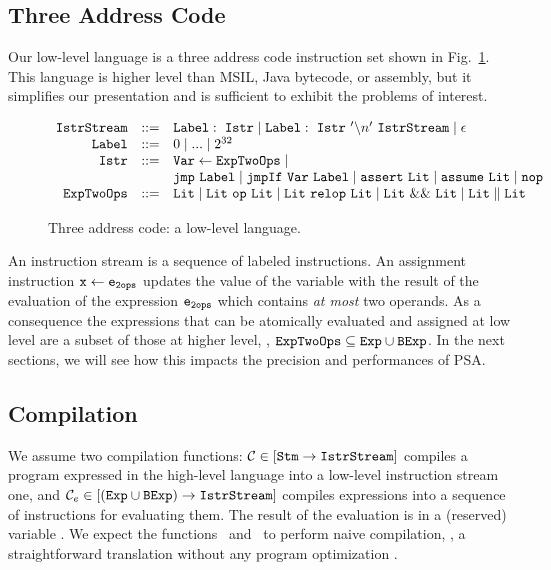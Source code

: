 \documentclass{llncs}
\begin{document}
\subsection{Three Address Code}
Our low-level language is a three address code instruction set shown
in Fig.~\ref{fig:ThreeAddressesInstructionSet}.  This
language is higher level than MSIL, Java bytecode, or assembly, but it
simplifies our presentation and is sufficient to exhibit the problems
of interest.
\begin{figure}[t]
\vspace*{-10pt}
  \[
  \begin{array}{rcll}
    \mathtt{IstrStream} &::=&  \mathtt{Label} : ~\mathtt{Istr} \mid \mathtt{Label} :~ \mathtt{Istr}~ '\backslash n'~ \mathtt{IstrStream} \mid \epsilon \\
    \mathtt{Label} & ::= & 0 \mid ... \mid 2^{32} \\
    \mathtt{Istr} & ::= &\mathtt{Var} \leftarrow \mathtt{ExpTwoOps} \mid \\ 
    && \mathtt{jmp}~ \mathtt{Label} \mid \mathtt{jmpIf}~ \mathtt{Var}~ \mathtt{Label} \mid  \mathtt{assert}~ \mathtt{Lit} \mid \mathtt{assume}~ \mathtt{Lit} \mid \mathtt{nop} \\
    \mathtt{ExpTwoOps} & ::= &  \mathtt{Lit} \mid  \mathtt{Lit}~ \mathtt{op}~ \mathtt{Lit}  \mid \mathtt{Lit}~ \mathtt{relop}~ \mathtt{Lit} \mid  \mathtt{Lit}~ \&\&~ \mathtt{Lit} \mid \mathtt{Lit} \parallel \mathtt{Lit}  
  \end{array}
  \]
\vspace*{-10pt}
  \caption{Three address code: a low-level language.}
  \label{fig:ThreeAddressesInstructionSet}
\end{figure}

An instruction stream is a sequence of labeled instructions.  An
assignment instruction $\mathtt{x} \leftarrow \mathtt{e_{2ops}}$ updates the
value of the variable  with the result of the evaluation of
the expression $\mathtt{e_{2ops}}$ which contains \emph{at most} two
operands.  As a consequence the expressions that can be atomically
evaluated and assigned at low level are a subset of those at higher
level, \ie, $\mathtt{ExpTwoOps} \subseteq \mathtt{Exp} \cup \mathtt{BExp}$.  In the next
sections, we will see how this impacts the precision and performances
of PSA.


\subsection{Compilation}
We assume two compilation functions: $\mathcal{C} \in
[\mathtt{Stm} \rightarrow\mathtt{IstrStream}]$ compiles a program expressed in the
high-level language into a low-level instruction stream one, and $\mathcal{C}_{e} \in
[(\mathtt{Exp} \cup \mathtt{BExp}) \rightarrow\mathtt{IstrStream}]$ compiles expressions into a
sequence of instructions for evaluating them.  The result of the
evaluation is in a (reserved) variable \result.
We expect the functions \Comp\ and \Compexp\ to perform
naive compilation, \ie, a straightforward translation without any
program optimization \cite{AhoSethiUllman}.
\nopagebreak[4]
\end{document}
